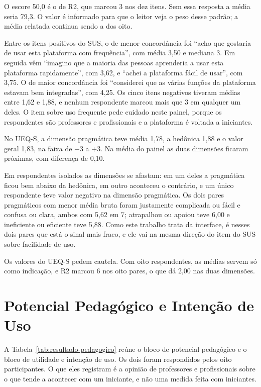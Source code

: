 O escore 50,0 é o de R2, que marcou 3 nos dez itens. Sem essa resposta a média seria 79,3. O valor é informado para que o leitor veja o peso desse padrão; a média relatada continua sendo a dos oito.

Entre os itens positivos do SUS, o de menor concordância foi ``acho que gostaria de usar esta plataforma com frequência'', com média 3,50 e mediana 3. Em seguida vêm ``imagino que a maioria das pessoas aprenderia a usar esta plataforma rapidamente'', com 3,62, e ``achei a plataforma fácil de usar'', com 3,75. O de maior concordância foi ``considerei que as várias funções da plataforma estavam bem integradas'', com 4,25. Os cinco itens negativos tiveram médias entre 1,62 e 1,88, e nenhum respondente marcou mais que 3 em qualquer um deles. O item sobre uso frequente pede cuidado neste painel, porque os respondentes são professores e profissionais e a plataforma é voltada a iniciantes.

No UEQ-S, a dimensão pragmática teve média 1,78, a hedônica 1,88 e o valor geral 1,83, na faixa de $-3$ a $+3$. Na média do painel as duas dimensões ficaram próximas, com diferença de 0,10.

Em respondentes isolados as dimensões se afastam: em um deles a pragmática ficou bem abaixo da hedônica, em outro aconteceu o contrário, e um único respondente teve valor negativo na dimensão pragmática. Os dois pares pragmáticos com menor média bruta foram justamente complicada ou fácil e confusa ou clara, ambos com 5,62 em 7; atrapalhou ou apoiou teve 6,00 e ineficiente ou eficiente teve 5,88. Como este trabalho trata da interface, é nesses dois pares que está o sinal mais fraco, e ele vai na mesma direção do item do SUS sobre facilidade de uso.

Os valores do UEQ-S pedem cautela. Com oito respondentes, as médias servem só como indicação, e R2 marcou 6 nos oito pares, o que dá 2,00 nas duas dimensões.

\section{Potencial Pedagógico e Intenção de Uso}
\label{sec:resultado-pedagogico}

A Tabela~\ref{tab:resultado-pedagogico} reúne o bloco de potencial pedagógico e o bloco de utilidade e intenção de uso. Os dois foram respondidos pelos oito participantes. O que eles registram é a opinião de professores e profissionais sobre o que tende a acontecer com um iniciante, e não uma medida feita com iniciantes.

